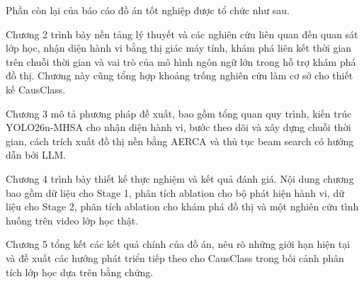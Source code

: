 Phần còn lại của báo cáo đồ án tốt nghiệp được tổ chức như sau.

Chương 2 trình bày nền tảng lý thuyết và các nghiên cứu liên quan đến quan sát lớp học, nhận diện hành vi bằng thị giác máy tính, khám phá liên kết thời gian trên chuỗi thời gian và vai trò của mô hình ngôn ngữ lớn trong hỗ trợ khám phá đồ thị. Chương này cũng tổng hợp khoảng trống nghiên cứu làm cơ sở cho thiết kế CausClass.

Chương 3 mô tả phương pháp đề xuất, bao gồm tổng quan quy trình, kiến trúc YOLO26n-MHSA cho nhận diện hành vi, bước theo dõi và xây dựng chuỗi thời gian, cách trích xuất đồ thị nền bằng AERCA và thủ tục beam search có hướng dẫn bởi LLM.

Chương 4 trình bày thiết kế thực nghiệm và kết quả đánh giá. Nội dung chương bao gồm dữ liệu cho Stage 1, phân tích ablation cho bộ phát hiện hành vi, dữ liệu cho Stage 2, phân tích ablation cho khám phá đồ thị và một nghiên cứu tình huống trên video lớp học thật.

Chương 5 tổng kết các kết quả chính của đồ án, nêu rõ những giới hạn hiện tại và đề xuất các hướng phát triển tiếp theo cho CausClass trong bối cảnh phân tích lớp học dựa trên bằng chứng.